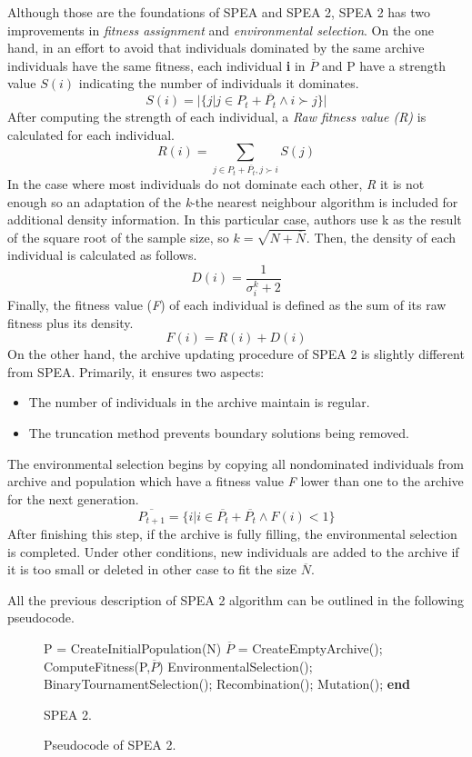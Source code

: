 Although those are the foundations of SPEA and SPEA 2, SPEA 2 has two improvements in \textit{fitness assignment} and \textit{environmental selection}.
On the one hand, in an effort to avoid that individuals dominated by the same archive individuals have the same fitness, each individual \textbf{i} in $\overline{P}$ and P have a strength value $S(i)$ indicating the number of individuals it dominates\cite{SPEA2}.
\[
    S(i) = | \{ j | j \in P_{t} + \overline{P_{t}} \land	 i \succ j \} |
\]
After computing the strength of each individual, a \textit{Raw fitness value (R)} is calculated for each individual.
\[
    R(i) = \sum_{j\in P_{t} + \overline{P_{t}}, j \succ i}{S(j)}
\]
In the case where most individuals do not dominate each other, \textit{R} it is not enough so an adaptation of the \textit{k}-the nearest neighbour algorithm is included for additional density information. In this particular case, authors use k as the result of the square root of the sample size, so $k = \sqrt{N + \overline{N}}$. Then, the density of each individual is calculated as follows.
\[
    D(i) = \frac{1}{\sigma_{i}^{k} + 2}
\]
Finally, the fitness value (\textit{F}) of each individual is defined as the sum of its raw fitness plus its density.
\[
    F(i) = R(i) + D(i)
\]
On the other hand, the archive updating procedure of SPEA 2 is slightly different from SPEA. Primarily, it ensures two aspects\cite{SPEA2}: 
\begin{itemize}
    \item The number of individuals in the archive maintain is regular.
    \item The truncation method prevents boundary solutions being removed.
\end{itemize}
The environmental selection begins by copying all nondominated individuals from archive and population which have a fitness value \textit{F} lower than one to the archive for the next generation.
\[
\overline{P_{t+1}} = \{ i | i \in \overline{P_{t}} + \overline{P_{t}} \land F(i) < 1 \}
\]
After finishing this step, if the archive is fully filling, the environmental selection is completed. Under other conditions, new individuals are added to the archive if it is too small or deleted in other case to fit the size $\overline{N}$.

All the previous description of SPEA 2 algorithm can be outlined in the following pseudocode.
\begin{figure}
    \centering
\begin{algorithm}[H]
\begin{algorithmic}[1]
\State P = CreateInitialPopulation(N)\;
\State $\overline{P}$ = CreateEmptyArchive();\;
    \State ComputeFitness(P,$\overline{P}$)
    \State EnvironmentalSelection();
    \State BinaryTournamentSelection();
    \State Recombination();
    \State Mutation();
  \EndWhile
  \State \textbf{end}
\end{algorithmic}
\caption{SPEA 2.}
\end{algorithm}    
\caption{Pseudocode of SPEA 2.}
\end{figure}